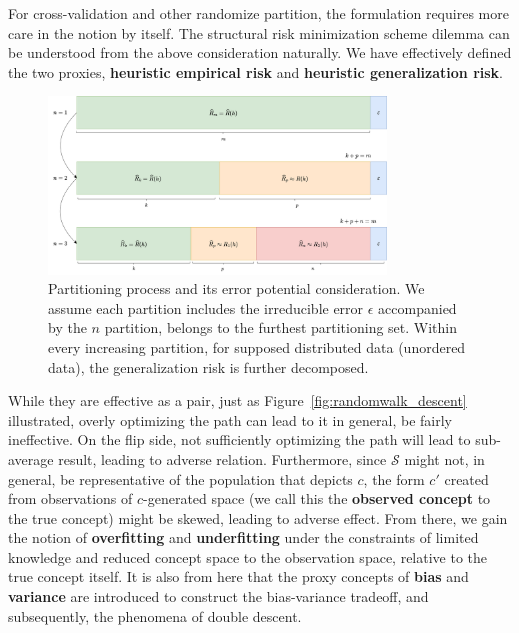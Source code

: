 For cross-validation and other randomize partition, the formulation requires more care in the notion by itself. The structural risk minimization scheme dilemma can be understood from the above consideration naturally. We have effectively defined the two proxies, \textbf{heuristic empirical risk} and \textbf{heuristic generalization risk}. 

\begin{figure}[htb]
    \centering
    \includegraphics[width=0.8\textwidth]{img/mamamia.png}
    \caption{Partitioning process and its error potential consideration. We assume each partition includes the irreducible error $\epsilon$ accompanied by the $n$ partition, belongs to the furthest partitioning set. Within every increasing partition, for supposed distributed data (unordered data), the generalization risk is further decomposed.}
\end{figure}

While they are effective as a pair, just as Figure~\ref{fig:randomwalk_descent} illustrated, overly optimizing the path can lead to it in general, be fairly ineffective. On the flip side, not sufficiently optimizing the path will lead to sub-average result, leading to adverse relation. Furthermore, since $\mathcal{S}$ might not, in general, be representative of the population that depicts $c$, the form $c'$ created from observations of $c$-generated space (we call this the \textbf{observed concept} to the true concept) might be skewed, leading to adverse effect. From there, we gain the notion of \textbf{overfitting} and \textbf{underfitting} under the constraints of limited knowledge and reduced concept space to the observation space, relative to the true concept itself. It is also from here that the proxy concepts of \textbf{bias} and \textbf{variance} are introduced to construct the bias-variance tradeoff, and subsequently, the phenomena of double descent. 

